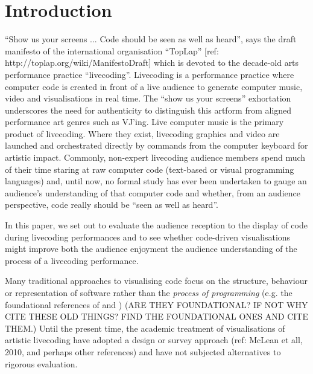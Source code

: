\documentclass{sig-alternate}
\begin{document}



\section{Introduction}


``Show us your screens ... Code should be seen as well as heard'', says the draft manifesto of the international organisation ``TopLap'' [ref: http://toplap.org/wiki/ManifestoDraft] which is devoted to the decade-old arts performance practice ``livecoding''. Livecoding is a performance practice where computer code is created in front of a live audience to generate computer music, video and visualisations in real time. The ``show us your screens'' exhortation underscores the need for authenticity to distinguish this artform from aligned performance art genres such as VJ'ing. Live computer music is the primary product of livecoding. Where they exist, livecoding graphics and video are launched and orchestrated directly by commands from the computer keyboard for artistic impact. Commonly, non-expert livecoding audience members spend much of their time staring at raw computer code (text-based or visual programming languages) and, until now, no formal study has ever been undertaken to gauge an audience's understanding of that computer code and whether, from an audience perspective, code really should be ``seen as well as heard''. 

In this paper, we set out to evaluate the audience reception to the display of code during livecoding performances and to see whether code-driven visualisations  might improve both the audience enjoyment the audience understanding of the process of a livecoding performance.
  
Many traditional approaches to visualising code focus on the structure, behaviour or representation of software rather than the {\it process of programming} (e.g. the foundational references of \cite{Ball1996} and \cite{Price1992}) (ARE THEY FOUNDATIONAL? IF NOT WHY CITE THESE OLD THINGS? FIND THE FOUNDATIONAL ONES AND CITE THEM.) Until the present time, the academic treatment of visualisations of artistic livecoding have adopted a design or survey approach (ref: McLean et all, 2010, and perhaps other references) and have not subjected alternatives to rigorous evaluation.
\end{document}
